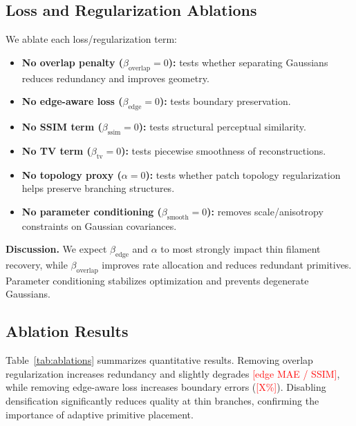 \documentclass[11pt]{article}
\begin{document}
\subsection{Loss and Regularization Ablations}
\label{sec:ablation_loss}
We ablate each loss/regularization term:
\begin{itemize}
  \item \textbf{No overlap penalty ($\beta_{\text{overlap}}=0$):} tests whether separating Gaussians reduces redundancy and improves geometry.
  \item \textbf{No edge-aware loss ($\beta_{\text{edge}}=0$):} tests boundary preservation.
  \item \textbf{No SSIM term ($\beta_{\text{ssim}}=0$):} tests structural perceptual similarity.
  \item \textbf{No TV term ($\beta_{\text{tv}}=0$):} tests piecewise smoothness of reconstructions.
  \item \textbf{No topology proxy ($\alpha=0$):} tests whether patch topology regularization helps preserve branching structures.
  \item \textbf{No parameter conditioning ($\beta_{\text{smooth}}=0$):} removes scale/anisotropy constraints on Gaussian covariances.
\end{itemize}

\textbf{Discussion.}
We expect $\beta_{\text{edge}}$ and $\alpha$ to most strongly impact thin filament recovery, while $\beta_{\text{overlap}}$ improves rate allocation and reduces redundant primitives.
Parameter conditioning stabilizes optimization and prevents degenerate Gaussians.

\subsection{Ablation Results}
\label{sec:ablation_results}
Table~\ref{tab:ablations} summarizes quantitative results.
Removing overlap regularization increases redundancy and slightly degrades \textcolor{red}{[edge MAE / SSIM]}, while removing edge-aware loss increases boundary errors (\textcolor{red}{[X\%]}).
Disabling densification significantly reduces quality at thin branches, confirming the importance of adaptive primitive placement.
\end{document}
